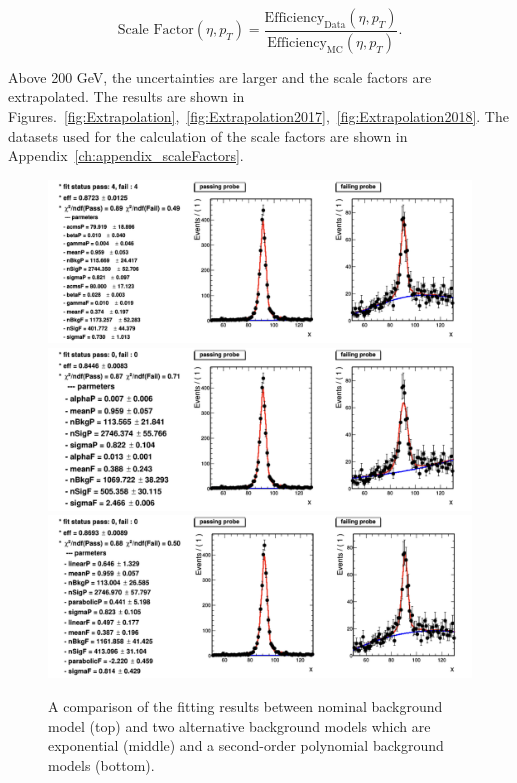 \begin{equation} \label{eq:SF}
  \text{Scale Factor}(\eta,p_{T}) = \frac{\text{Efficiency}_{\text{Data}}(\eta,p_{T})}{\text{Efficiency}_{\text{MC}}(\eta,p_{T})}.
\end{equation}

Above 200 GeV, the uncertainties are larger and the scale factors are extrapolated. The results are shown in Figures.~\ref{fig:Extrapolation},~\ref{fig:Extrapolation2017},~\ref{fig:Extrapolation2018}. The datasets used for the calculation of the scale factors are shown in Appendix~\ref{ch:appendix_scaleFactors}.

\begin{figure}[!htbp]
  \centering
  \includegraphics[width=1.0\textwidth]{fig/NominalBkg.png}\\
  \includegraphics[width=1.0\textwidth]{fig/AltBkg_exponential.png}\\
 \includegraphics[width=1.0\textwidth]{fig/AltBkg_Polynomial.png}
  \caption{A comparison of the fitting results between nominal background model (top) and two alternative background models which are exponential (middle) and a second-order polynomial background models (bottom).}
  \label{fig:Sysbkg}
\end{figure}

